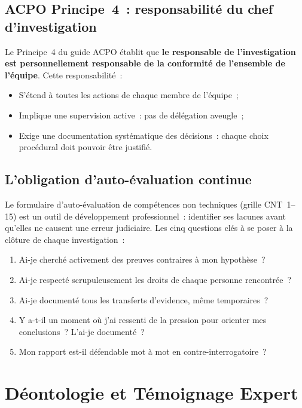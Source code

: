 \subsection{ACPO Principe~4~: responsabilité du chef d'investigation}

Le Principe~4 du guide ACPO établit que \textbf{le responsable de
l'investigation est personnellement responsable de la conformité de
l'ensemble de l'équipe}. Cette responsabilité~:
\begin{itemize}
    \item S'étend à toutes les actions de chaque membre de l'équipe~;
    \item Implique une supervision active~: pas de délégation aveugle~;
    \item Exige une documentation systématique des décisions~: chaque
          choix procédural doit pouvoir être justifié.
\end{itemize}

\subsection{L'obligation d'auto-évaluation continue}

Le formulaire d'auto-évaluation de compétences non techniques (grille
CNT~1--15) est un outil de développement professionnel~: identifier
ses lacunes avant qu'elles ne causent une erreur judiciaire. Les cinq
questions clés à se poser à la clôture de chaque investigation~:

\begin{enumerate}
    \item Ai-je cherché activement des preuves contraires à mon hypothèse~?
    \item Ai-je respecté scrupuleusement les droits de chaque personne
          rencontrée~?
    \item Ai-je documenté tous les transferts d'evidence, même temporaires~?
    \item Y a-t-il un moment où j'ai ressenti de la pression pour
          orienter mes conclusions~? L'ai-je documenté~?
    \item Mon rapport est-il défendable mot à mot en contre-interrogatoire~?
\end{enumerate}

\section{Déontologie et Témoignage Expert}
\label{sec:temoignage-expert}

